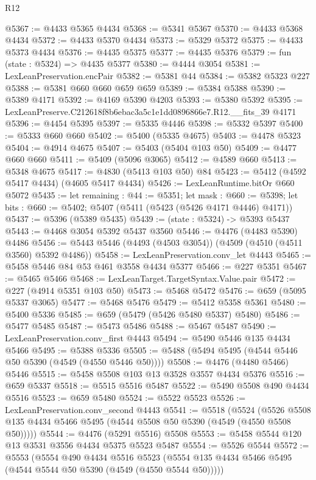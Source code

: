 \begin{lexlean}{R12}
\begin{coremodule}
@5367 := @4433 @5365 @4434
@5368 := @5341 @5367
@5370 := @4433 @5368 @4434
@5372 := @4433 @5370 @4434
@5373 := @5329 @5372
@5375 := @4433 @5373 @4434
@5376 := @4435 @5375
@5377 := @4435 @5376
@5379 := fun (state : @5324) => @4435 @5377
@5380 := @4444 @3054
@5381 := LexLeanPreservation.encPair
@5382 := @5381 @44
@5384 := @5382 @5323 @227
@5388 := @5381 @660 @660 @659 @659
@5389 := @5384 @5388
@5390 := @5389 @4171
@5392 := @4169 @5390 @4203
@5393 := @5380 @5392
@5395 := LexLeanPreserve.C212618f8b6ebac3a5c1e1dd0896866e7.R12.__fits_39 @4171
@5396 := @4454 @5395
@5397 := @5335 @4446
@5398 := @5332 @5397
@5400 := @5333 @660 @660
@5402 := @5400 (@5335 @4675)
@5403 := @4478 @5323
@5404 := @4914 @4675
@5407 := @5403 (@5404 @103 @50)
@5409 := @4477 @660 @660
@5411 := @5409 (@5096 @3065)
@5412 := @4589 @660
@5413 := @5348 @4675
@5417 := @4830 (@5413 @103 @50) @84
@5423 := @5412 (@4592 @5417 @4434) (@4605 @5417 @4434)
@5426 := LexLeanRuntime.bitOr @660 @5072
@5435 := let remaining : @44 := @5351;
  let mask : @660 := @5398;
  let bits : @660 := @5402; @5407 (@5411 (@5423 (@5426 @4171 @4446) @4171))
@5437 := @5396 (@5389 @5435)
@5439 := (state : @5324) -> @5393 @5437
@5443 := @4468 @3054 @5392 @5437 @3560
@5446 := @4476 (@4483 @5390) @4486
@5456 := @5443 @5446 (@4493 (@4503 @3054)) (@4509 (@4510 (@4511 @3560) @5392 @4486))
@5458 := LexLeanPreservation.conv_let @4443
@5465 := @5458 @5446 @84 @53 @461 @3558 @4434 @5377
@5466 := @227 @5351
@5467 := @5465 @5466
@5468 := LexLeanTarget.TargetSyntax.Value.pair
@5472 := @227 (@4914 @5351 @103 @50)
@5473 := @5468 @5472
@5476 := @659 (@5095 @5337 @3065)
@5477 := @5468 @5476
@5479 := @5412 @5358 @5361
@5480 := @5400 @5336
@5485 := @659 (@5479 (@5426 @5480 @5337) @5480)
@5486 := @5477 @5485
@5487 := @5473 @5486
@5488 := @5467 @5487
@5490 := LexLeanPreservation.conv_first @4443
@5494 := @5490 @5446 @135 @4434 @5466
@5495 := @5388 @5336
@5505 := @5488 (@5494 @5495 (@4544 @5446 @50 @5390 (@4549 (@4550 @5446 @50))))
@5508 := @4476 (@4480 @5466) @5446
@5515 := @5458 @5508 @103 @13 @3528 @3557 @4434 @5376
@5516 := @659 @5337
@5518 := @5515 @5516 @5487
@5522 := @5490 @5508 @490 @4434 @5516
@5523 := @659 @5480
@5524 := @5522 @5523
@5526 := LexLeanPreservation.conv_second @4443
@5541 := @5518
    (@5524 (@5526 @5508 @135 @4434 @5466 @5495 (@4544 @5508 @50 @5390 (@4549 (@4550 @5508 @50)))))
@5544 := @4476 (@5291 @5516) @5508
@5553 := @5458 @5544 @120 @13 @3531 @3556 @4434 @5375 @5523 @5487
@5554 := @5526 @5544
@5572 := @5553
    (@5554
      @490
      @4434
      @5516
      @5523
      (@5554 @135 @4434 @5466 @5495 (@4544 @5544 @50 @5390 (@4549 (@4550 @5544 @50)))))

\end{coremodule}
\end{lexlean}

